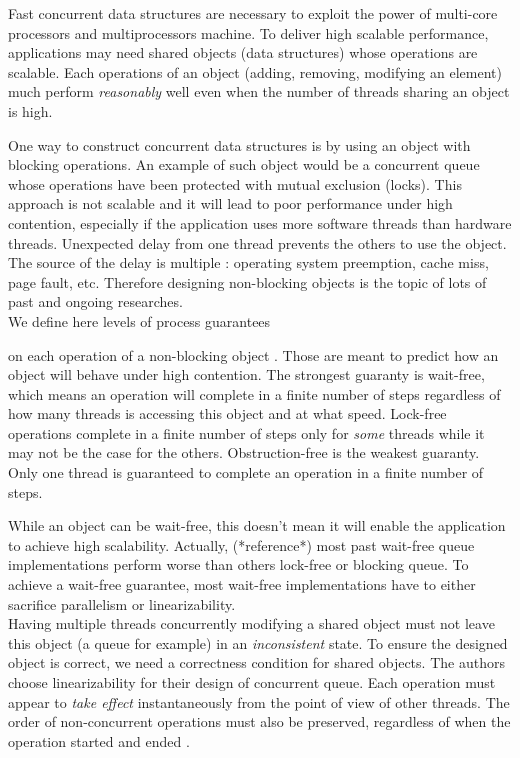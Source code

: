 Fast concurrent data structures are necessary to exploit the power of multi-core
processors and multiprocessors machine. To deliver high scalable performance,
applications may need shared objects (data structures) whose operations are
scalable. Each operations of an object (adding, removing, modifying an element)
much perform \textit{reasonably} well even when the number of threads sharing an
object is high.

One way to construct concurrent data structures is by using an object with
blocking operations. An example of such object would be a concurrent queue whose
operations have been protected with mutual exclusion (locks). This approach is
not scalable and it will lead to poor performance under high contention,
especially if the application uses more software threads than hardware threads.
Unexpected delay from one thread prevents the others to use the object. The
source of the delay is multiple : operating system preemption, cache miss, page
fault, etc. Therefore designing non-blocking objects is the topic of lots of
past and ongoing researches. \\

 We define here levels of process guarantees

on each operation of a non-blocking object \cite{Yang:2016:WQF:3016078.2851168}.
Those are meant to predict how an object will behave under high contention. The
strongest guaranty is wait-free, which means an operation will complete in a
finite number of steps regardless of how many threads is accessing this object
and at what speed. Lock-free operations complete in a finite number of steps
only for \textit{some} threads while it may not be the case for the others.
Obstruction-free is the weakest guaranty. Only one thread is guaranteed to
complete an operation in a finite number of steps.

While an object can be wait-free, this doesn't mean it will enable the
application to achieve high scalability. Actually, (*reference*) most past
wait-free queue implementations perform worse than others lock-free or blocking
queue. To achieve a wait-free guarantee, most wait-free implementations have to
either sacrifice parallelism or linearizability. \\

 Having multiple threads concurrently modifying a shared
object must not leave this object (a queue for example) in an
\textit{inconsistent} state. To ensure the designed object is correct, we need a
correctness condition for shared objects. The authors choose linearizability for
their design of concurrent queue. Each operation must appear to \textit{take
effect} instantaneously from the point of view of other threads. The order of
non-concurrent operations must also be preserved, regardless of when the
operation started and ended \cite{Herlihy:1990:LCC:78969.78972}.


